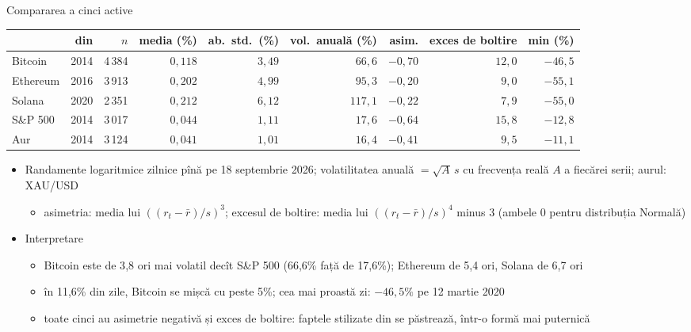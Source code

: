 \begin{frame}{Compararea a cinci active}
\itemsize{\footnotesize}
\begin{center}
\scriptsize
\begin{tabular}{lrrrrrrrr}
\toprule
& din & $n$ & media (\%) & ab.\ std.\ (\%) & vol.\ anuală (\%) & asim. & exces de boltire & min (\%) \\
\midrule
Bitcoin & 2014 & 4\,384 & $0{,}118$ & $3{,}49$ & $66{,}6$ & $-0{,}70$ & $12{,}0$ & $-46{,}5$ \\
Ethereum & 2016 & 3\,913 & $0{,}202$ & $4{,}99$ & $95{,}3$ & $-0{,}20$ & $9{,}0$ & $-55{,}1$ \\
Solana & 2020 & 2\,351 & $0{,}212$ & $6{,}12$ & $117{,}1$ & $-0{,}22$ & $7{,}9$ & $-55{,}0$ \\
S\&P 500 & 2014 & 3\,017 & $0{,}044$ & $1{,}11$ & $17{,}6$ & $-0{,}64$ & $15{,}8$ & $-12{,}8$ \\
Aur & 2014 & 3\,124 & $0{,}041$ & $1{,}01$ & $16{,}4$ & $-0{,}41$ & $9{,}5$ & $-11{,}1$ \\
\bottomrule
\end{tabular}
\end{center}
\begin{itemize}
    \item Randamente logaritmice zilnice pînă pe 18 septembrie 2026; volatilitatea anuală $= \sqrt{A}\,s$ cu frecvența reală $A$ a fiecărei serii; aurul: XAU/USD
    \begin{itemize}
        \item asimetria: media lui $((r_t - \bar r)/s)^3$; excesul de boltire: media lui $((r_t - \bar r)/s)^4$ minus 3 (ambele 0 pentru distribuția Normală)
    \end{itemize}
    \item Interpretare
    \begin{itemize}
        \item Bitcoin este de 3{,}8 ori mai volatil decît S\&P 500 (66{,}6\% față de 17{,}6\%); Ethereum de 5{,}4 ori, Solana de 6{,}7 ori
        \item în 11{,}6\% din zile, Bitcoin se mișcă cu peste 5\%; cea mai proastă zi: $-46{,}5\%$ pe 12 martie 2020
        \item toate cinci au asimetrie negativă și exces de boltire: faptele stilizate din  se păstrează, într-o formă mai puternică
    \end{itemize}
\end{itemize}
\end{frame}


